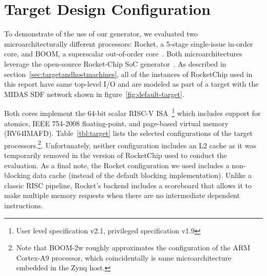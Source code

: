\section{Target Design Configuration}

To demonstrate of the use of our generator, we evaluated two
microarchitecturally different processors:  Rocket, a 5-stage single-issue
in-order core, and BOOM, a superscalar out-of-order core~\cite{boom}. Both
microarchitectures leverage the open-source Rocket-Chip SoC
generator~\cite{rocketchip}. As described in section~\ref{sec:targetandhostmachines}, all of the instances of RocketChip used in
this report have same top-level I/O and are modeled as part of a target with
the MIDAS SDF network shown in figure~\ref{fig:default-target}.

Both cores implement the 64-bit scalar RISC-V ISA~\cite{Waterman:EECS-2016-118,
Waterman:EECS-2016-161}\footnote{User level specification v2.1, privileged
specification v1.9} which includes support for atomics, IEEE 754-2008
floating-point, and page-based virtual memory (RV64IMAFD).
Table~\ref{tbl:target} lists the selected configurations of the target
processors.\footnote{Note that BOOM-2w roughly approximates the configuration
of the ARM Cortex-A9 processor, which coincidentally is same microarchitecture
embedded in the Zynq host.}. Unfortunately, neither configuration includes an
L2 cache as it was  temporarily removed in the version of RocketChip used to
conduct the evaluation. As a final note, the Rocket configuration we used
includes a non-blocking data cache (instead of the default blocking
implementation). Unlike a classic RISC pipeline, Rocket's backend includes a
scoreboard that allows it to make multiple memory requests when there are no
intermediate dependent instructions.

\begin{table}
\begin{center}
\end{center}
\caption{Processor Parameters}
\label{tbl:target}
\end{table}%


